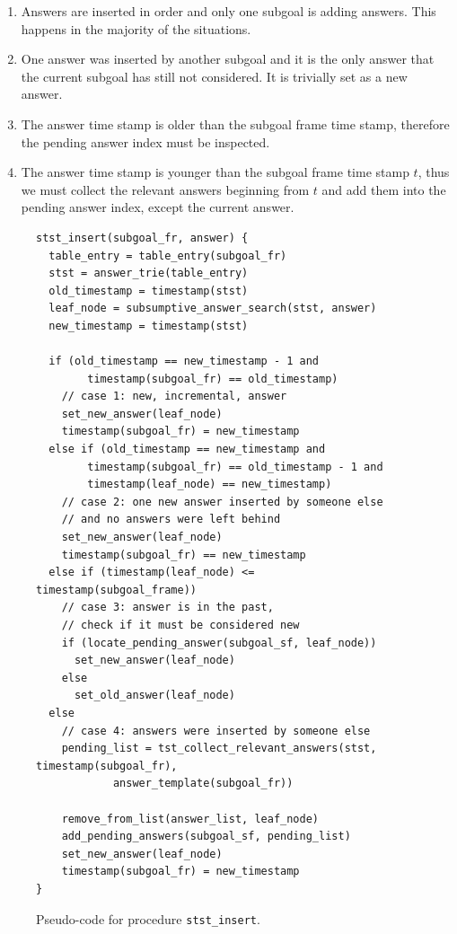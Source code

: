 \begin{enumerate}
   \item Answers are inserted in order and only one subgoal is adding answers.
   This happens in the majority of the situations.
   \item One answer was inserted by another subgoal and it is the only answer that
   the current subgoal has still not considered. It is trivially set as a new answer.
   \item The answer time stamp is older than the subgoal frame time stamp, therefore
   the pending answer index must be inspected.
   \item The answer time stamp is younger than the subgoal frame time stamp $t$, thus
   we must collect the relevant answers beginning from $t$ and add them into the pending
   answer index, except the current answer.
\end{enumerate}

\begin{figure}[ht]
\begin{Verbatim}
stst_insert(subgoal_fr, answer) {
  table_entry = table_entry(subgoal_fr)
  stst = answer_trie(table_entry)
  old_timestamp = timestamp(stst)
  leaf_node = subsumptive_answer_search(stst, answer)
  new_timestamp = timestamp(stst)
  
  if (old_timestamp == new_timestamp - 1 and
        timestamp(subgoal_fr) == old_timestamp)
    // case 1: new, incremental, answer
    set_new_answer(leaf_node)
    timestamp(subgoal_fr) = new_timestamp
  else if (old_timestamp == new_timestamp and
        timestamp(subgoal_fr) == old_timestamp - 1 and
        timestamp(leaf_node) == new_timestamp)
    // case 2: one new answer inserted by someone else
    // and no answers were left behind
    set_new_answer(leaf_node)
    timestamp(subgoal_fr) == new_timestamp
  else if (timestamp(leaf_node) <= timestamp(subgoal_frame))
    // case 3: answer is in the past,
    // check if it must be considered new
    if (locate_pending_answer(subgoal_sf, leaf_node))
      set_new_answer(leaf_node)
    else
      set_old_answer(leaf_node)
  else
    // case 4: answers were inserted by someone else
    pending_list = tst_collect_relevant_answers(stst, timestamp(subgoal_fr),
            answer_template(subgoal_fr))
    
    remove_from_list(answer_list, leaf_node)
    add_pending_answers(subgoal_sf, pending_list)
    set_new_answer(leaf_node)
    timestamp(subgoal_fr) = new_timestamp
}
\end{Verbatim}
\caption{Pseudo-code for procedure \texttt{stst\_insert}.}
\label{fig:stst_insert}
\end{figure}

